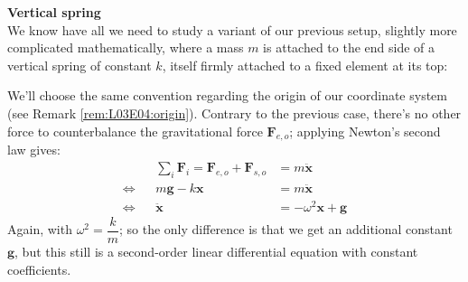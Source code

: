 \documentclass[solutions.tex]{subfiles}
\renewcommand{\bm}[1]{\pmb{#1}}
\begin{document}
\hr
\textbf{Vertical spring} \\
We know have all we need to study a variant of our previous setup,
slightly more complicated mathematically, where a mass $m$ is
attached to the end side of a vertical spring of constant $k$, itself
firmly attached to a fixed element at its top:
\begin{figure}[H]
	\centering
\end{figure}
We'll choose the same convention regarding the origin of our coordinate system
(see Remark \ref{rem:L03E04:origin}). Contrary to the previous case, there's
no other force to counterbalance the gravitational force $\bm{F}_{e,o}$;
applying Newton's second law gives:
\begin{equation*} \begin{aligned}
	~ && \sum_i \bm{F}_i = \bm{F}_{e,o} + \bm{F}_{s,o} &= m\ddot{\bm{x}} \\
	\Leftrightarrow && m\bm{g} - k\bm{x} &= m\ddot{\bm{x}} \\
	\Leftrightarrow && \ddot{\bm{x}} &= -\omega^2\bm{x}+\bm{g}
\end{aligned} \end{equation*}
Again, with $\omega^2 = \dfrac{k}{m}$; so the only difference is
that we get an additional constant $\bm{g}$, but this still is a
second-order linear differential equation with constant coefficients.
\end{document}
